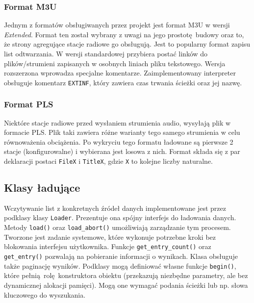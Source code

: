 \documentclass[polish]{aghengthesis}
\begin{document}
			\subsubsection{Format M3U}
				Jednym z formatów obsługiwanych przez projekt jest format M3U\textsuperscript{\cite{m3u}} w wersji \textit{Extended}. Format ten został wybrany z uwagi na jego prostotę budowy oraz to, że strony agregujące stacje radiowe go obsługują. Jest to popularny format zapisu list odtwarzania. W wersji standardowej przybiera postać linków do plików/strumieni zapisanych w osobnych liniach pliku tekstowego. Wersja rozszerzona wprowadza specjalne komentarze. Zaimplementowany interpreter obsługuje komentarz \lstinline|EXTINF|, który zawiera czas trwania ścieżki oraz jej nazwę.
			
			\subsubsection{Format PLS}
				Niektóre stacje radiowe przed wysłaniem strumienia audio, wysyłają plik w formacie PLS\textsuperscript{\cite{pls}}. Plik taki zawiera różne warianty tego samego strumienia w celu równoważenia obciążenia. Po wykryciu tego formatu ładowane są pierwsze 2 stacje (konfigurowalne) i wybierana jest losowa z nich. Format składa się z par deklaracji postaci \lstinline|FileX| i \lstinline|TitleX|, gdzie \lstinline|X| to kolejne liczby naturalne.
			
			
		\subsection{Klasy ładujące}
			Wczytywanie list z konkretnych źródeł danych implementowane jest przez podklasy klasy \lstinline|Loader|. Prezentuje ona spójny interfejs do ładowania danych. Metody \lstinline|load()| oraz \lstinline|load_abort()| umożliwiają zarządzanie tym procesem. Tworzone jest zadanie systemowe, które wykonuje potrzebne kroki bez blokowania interfejsu użytkownika. Funkcje \lstinline|get_entry_count()| oraz \lstinline|get_entry()| pozwalają na pobieranie informacji o wynikach. Klasa obsługuje także paginację wyników. Podklasy mogą definiować własne funkcje \lstinline|begin()|, które pełnią rolę konstruktora obiektu (przekazują niezbędne parametry, ale bez dynamicznej alokacji pamięci). Mogą one wymagać podania ścieżki lub np. słowa kluczowego do wyszukania.
			
\end{document}
